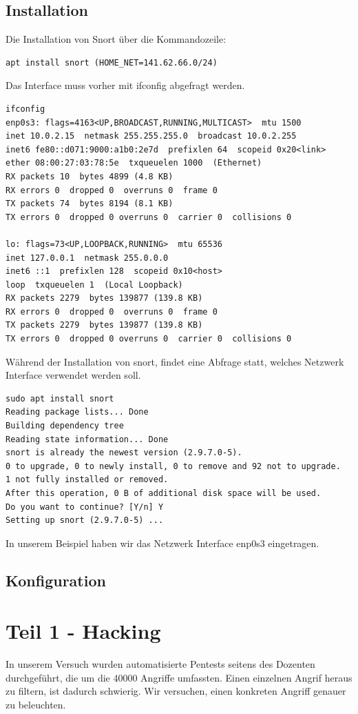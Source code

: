 \documentclass[a4paper]{report}
\begin{document}
\subsection{Installation}
Die Installation von Snort über die Kommandozeile:
\begin{lstlisting}
apt install snort (HOME_NET=141.62.66.0/24)
\end{lstlisting}
Das Interface muss vorher mit ifconfig abgefragt werden.
\begin{lstlisting}
ifconfig
enp0s3: flags=4163<UP,BROADCAST,RUNNING,MULTICAST>  mtu 1500
inet 10.0.2.15  netmask 255.255.255.0  broadcast 10.0.2.255
inet6 fe80::d071:9000:a1b0:2e7d  prefixlen 64  scopeid 0x20<link>
ether 08:00:27:03:78:5e  txqueuelen 1000  (Ethernet)
RX packets 10  bytes 4899 (4.8 KB)
RX errors 0  dropped 0  overruns 0  frame 0
TX packets 74  bytes 8194 (8.1 KB)
TX errors 0  dropped 0 overruns 0  carrier 0  collisions 0

lo: flags=73<UP,LOOPBACK,RUNNING>  mtu 65536
inet 127.0.0.1  netmask 255.0.0.0
inet6 ::1  prefixlen 128  scopeid 0x10<host>
loop  txqueuelen 1  (Local Loopback)
RX packets 2279  bytes 139877 (139.8 KB)
RX errors 0  dropped 0  overruns 0  frame 0
TX packets 2279  bytes 139877 (139.8 KB)
TX errors 0  dropped 0 overruns 0  carrier 0  collisions 0
\end{lstlisting}\newpage
Während der Installation von snort, findet eine Abfrage statt, welches Netzwerk Interface verwendet werden soll.
\begin{lstlisting}
sudo apt install snort
Reading package lists... Done
Building dependency tree      
Reading state information... Done
snort is already the newest version (2.9.7.0-5).
0 to upgrade, 0 to newly install, 0 to remove and 92 not to upgrade.
1 not fully installed or removed.
After this operation, 0 B of additional disk space will be used.
Do you want to continue? [Y/n] Y
Setting up snort (2.9.7.0-5) ...
\end{lstlisting}
In unserem Beispiel haben wir das Netzwerk Interface enp0s3 eingetragen.


\subsection{Konfiguration}

\section{Teil 1 - Hacking}
In unserem Versuch wurden automatisierte Pentests seitens des Dozenten durchgeführt, die um die 40000 Angriffe umfassten. Einen einzelnen Angrif heraus zu filtern, ist dadurch schwierig. Wir versuchen, einen konkreten Angriff genauer zu beleuchten.
\end{document}
